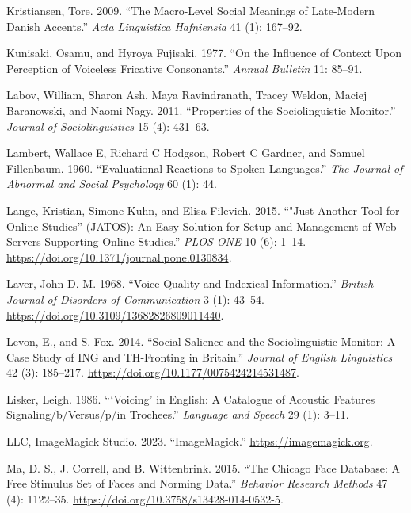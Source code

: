 \documentclass[
  letterpaper,
  DIV=11,
  numbers=noendperiod]{scrartcl}
\newlength{\cslhangindent}
\newenvironment{CSLReferences}[2] %
 {\begin{list}{}{%
  \setlength{\itemindent}{0pt}
  \setlength{\leftmargin}{0pt}
  \setlength{\parsep}{0pt}
  \ifodd #1
   \setlength{\leftmargin}{\cslhangindent}
   \setlength{\itemindent}{-1\cslhangindent}
  \fi
  \setlength{\itemsep}{#2\baselineskip}}}
 {\end{list}}
\begin{document}
\begin{CSLReferences}{1}{0}
Kristiansen, Tore. 2009. {``The Macro-Level Social Meanings of
Late-Modern Danish Accents.''} \emph{Acta Linguistica Hafniensia} 41
(1): 167--92.

Kunisaki, Osamu, and Hyroya Fujisaki. 1977. {``On the Influence of
Context Upon Perception of Voiceless Fricative Consonants.''}
\emph{Annual Bulletin} 11: 85--91.

Labov, William, Sharon Ash, Maya Ravindranath, Tracey Weldon, Maciej
Baranowski, and Naomi Nagy. 2011. {``Properties of the Sociolinguistic
Monitor.''} \emph{Journal of Sociolinguistics} 15 (4): 431--63.

Lambert, Wallace E, Richard C Hodgson, Robert C Gardner, and Samuel
Fillenbaum. 1960. {``Evaluational Reactions to Spoken Languages.''}
\emph{The Journal of Abnormal and Social Psychology} 60 (1): 44.

Lange, Kristian, Simone Kuhn, and Elisa Filevich. 2015. {``"Just Another
Tool for Online Studies'' (JATOS): An Easy Solution for Setup and
Management of Web Servers Supporting Online Studies.''} \emph{PLOS ONE}
10 (6): 1--14. \url{https://doi.org/10.1371/journal.pone.0130834}.

Laver, John D. M. 1968. {``Voice Quality and Indexical Information.''}
\emph{British Journal of Disorders of Communication} 3 (1): 43--54.
\url{https://doi.org/10.3109/13682826809011440}.

Levon, E., and S. Fox. 2014. {``Social Salience and the Sociolinguistic
Monitor: {A} Case Study of {ING} and {TH}-Fronting in Britain.''}
\emph{Journal of English Linguistics} 42 (3): 185--217.
\url{https://doi.org/10.1177/0075424214531487}.

Lisker, Leigh. 1986. {``{`Voicing'} in English: A Catalogue of Acoustic
Features Signaling/b/Versus/p/in Trochees.''} \emph{Language and Speech}
29 (1): 3--11.

LLC, ImageMagick Studio. 2023. {``ImageMagick.''}
\url{https://imagemagick.org}.

Ma, D. S., J. Correll, and B. Wittenbrink. 2015. {``The Chicago Face
Database: A Free Stimulus Set of Faces and Norming Data.''}
\emph{Behavior Research Methods} 47 (4): 1122--35.
\url{https://doi.org/10.3758/s13428-014-0532-5}.


\end{CSLReferences}
\end{document}
